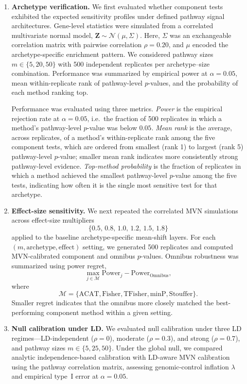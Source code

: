 \documentclass[unnumsec,webpdf,contemporary,large]{oup-authoring-template}%
\theoremstyle{thmstyleone}%
\theoremstyle{thmstyletwo}%
\theoremstyle{thmstylethree}%
\begin{document}
\begin{enumerate}
\item \textbf{Archetype verification.}
We first evaluated whether component tests exhibited the expected sensitivity profiles under defined pathway signal architectures. Gene-level statistics were simulated from a correlated multivariate normal model, $\mathbf{Z} \sim \mathcal{N}(\mu,\Sigma)$. Here, $\Sigma$ was an exchangeable correlation matrix with pairwise correlation $\rho=0.20$, and $\mu$ encoded the archetype-specific enrichment pattern. We considered pathway sizes $m \in \{5,20,50\}$ with 500 independent replicates per archetype--size combination. Performance was summarized by empirical power at $\alpha=0.05$, mean within-replicate rank of pathway-level $p$-values, and the probability of each method ranking top.

Performance was evaluated using three metrics. \emph{Power} is the empirical rejection rate at $\alpha=0.05$, i.e.\ the fraction of 500 replicates in which a method’s pathway-level $p$-value was below $0.05$. \emph{Mean rank} is the average, across replicates, of a method’s within-replicate rank among the five component tests, which are ordered from smallest (rank 1) to largest (rank 5) pathway-level $p$-value; smaller mean rank indicates more consistently strong pathway-level evidence. \emph{Top-method probability} is the fraction of replicates in which a method achieved the smallest pathway-level $p$-value among the five tests, indicating how often it is the single most sensitive test for that archetype.

\item \textbf{Effect-size sensitivity.}
We next repeated the correlated MVN simulations across effect-size multipliers
\[
\{0.5,\,0.8,\,1.0,\,1.2,\,1.5,\,1.8\}
\]
applied to the baseline archetype-specific mean-shift layers. For each $(m,\mathrm{archetype},\mathrm{effect})$ setting, we generated 500 replicates and computed MVN-calibrated component and omnibus $p$-values. Omnibus robustness was summarized using power regret,
\[
\max_{j \in \mathcal{M}} \mathrm{Power}_j - \mathrm{Power}_{\mathrm{Omnibus}},
\]
where
\[
\mathcal{M}
=
\{\mathrm{ACAT},\mathrm{Fisher},\mathrm{TFisher},\mathrm{minP},\mathrm{Stouffer}\}.
\]
Smaller regret indicates that the omnibus more closely matched the best-performing component method within a given setting.

\item \textbf{Null calibration under LD.}
We evaluated null calibration under three LD regimes---LD-independent ($\rho=0$), moderate ($\rho=0.3$), and strong ($\rho=0.7$), and pathway sizes $m \in \{5,25,50\}$. Under the global null, we compared analytic independence-based calibration with LD-aware MVN calibration using the pathway correlation matrix, assessing genomic-control inflation $\lambda$ and empirical type~I error at $\alpha=0.05$.


\end{enumerate}
\end{document}
